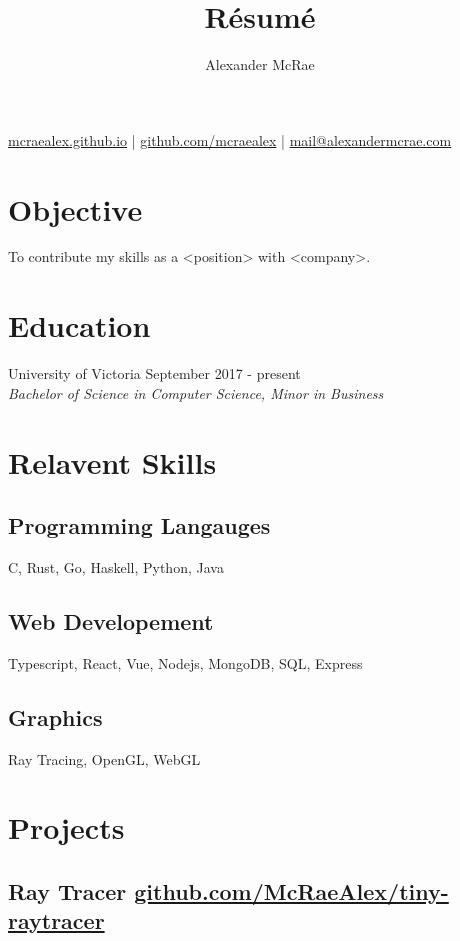 \documentclass{article}
\makeatletter
\renewcommand{\maketitle}{
\begin{center}
{\huge \bfseries \theauthor}

\vspace{0.25em}
\url{mcraealex.github.io} | \url{github.com/mcraealex} | \href{mailto:mail@alexandermcrae.com}{mail@alexandermcrae.com}
\end{center}}
\makeatother
\begin{document}
\title{R\'esum\'e}
\author{Alexander McRae}

\maketitle

\section{Objective}

To contribute my skills as a <position> with <company>.

\section{Education}

University of Victoria \hfill September 2017 - present\\
\textit{Bachelor of Science in Computer Science, Minor in Business}

\section{Relavent Skills}

\subsection{Programming Langauges}

C, Rust, Go, Haskell, Python, Java

\subsection{Web Developement}

Typescript, React, Vue, Nodejs, MongoDB, SQL, Express

\subsection{Graphics}

Ray Tracing, OpenGL, WebGL

\section{Projects}

\subsection{Ray Tracer \href{github.com/McRaeAlex/tiny-raytracer}{github.com/McRaeAlex/tiny-raytracer}}
\end{document}
